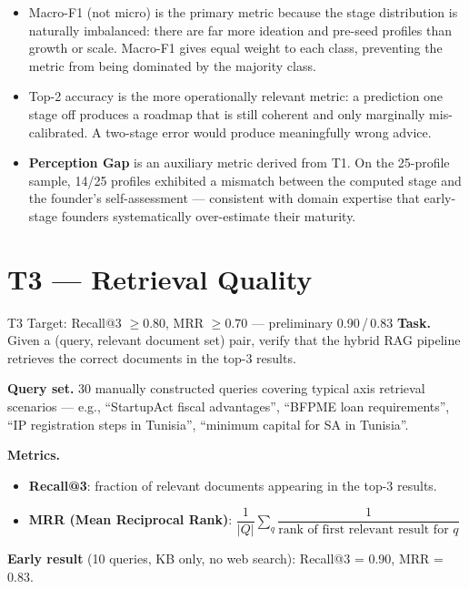 \documentclass[11pt,a4paper]{article}
\begin{document}
\begin{itemize}
  \item Macro-F1 (not micro) is the primary metric because the stage distribution is
        naturally imbalanced: there are far more ideation and pre-seed profiles than
        growth or scale. Macro-F1 gives equal weight to each class, preventing the
        metric from being dominated by the majority class.
  \item Top-2 accuracy is the more operationally relevant metric: a prediction one stage
        off produces a roadmap that is still coherent and only marginally mis-calibrated.
        A two-stage error would produce meaningfully wrong advice.
  \item \textbf{Perception Gap} is an auxiliary metric derived from T1. On the 25-profile
        sample, 14/25 profiles exhibited a mismatch between the computed stage and the
        founder's self-assessment — consistent with domain expertise that early-stage
        founders systematically over-estimate their maturity.
\end{itemize}

\section{T3 — Retrieval Quality}

\begin{pendingbox}{T3 Target: Recall@3 $\geq 0.80$, MRR $\geq 0.70$
— preliminary 0.90\,/\,0.83}
\textbf{Task.}
Given a (query, relevant document set) pair, verify that the hybrid RAG pipeline
retrieves the correct documents in the top-3 results.

\textbf{Query set.}
30 manually constructed queries covering typical axis retrieval scenarios —
e.g., ``StartupAct fiscal advantages'', ``BFPME loan requirements'',
``IP registration steps in Tunisia'', ``minimum capital for SA in Tunisia''.

\textbf{Metrics.}
\begin{itemize}
  \item \textbf{Recall@3}: fraction of relevant documents appearing in the top-3 results.
  \item \textbf{MRR (Mean Reciprocal Rank)}:
        $\dfrac{1}{|Q|}\sum_{q} \dfrac{1}{\text{rank of first relevant result for } q}$
\end{itemize}

\textbf{Early result} (10 queries, KB only, no web search): Recall@3 = 0.90, MRR = 0.83.
\end{pendingbox}
\end{document}
